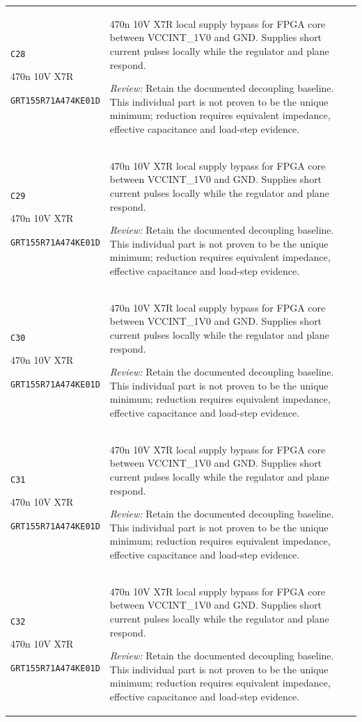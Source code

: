 \documentclass[10pt,a4paper]{article}
\begin{document}
\begin{longtable}{@{}P{46mm}P{117mm}@{}}
\nolinkurl{C28}\par 470n 10V X7R\par\scriptsize \nolinkurl{GRT155R71A474KE01D} & 470n 10V X7R local supply bypass for FPGA core between VCCINT\_1V0 and GND. Supplies short current pulses locally while the regulator and plane respond.\par\smallskip\textit{Review:} Retain the documented decoupling baseline. This individual part is not proven to be the unique minimum; reduction requires equivalent impedance, effective capacitance and load-step evidence. \\
\nolinkurl{C29}\par 470n 10V X7R\par\scriptsize \nolinkurl{GRT155R71A474KE01D} & 470n 10V X7R local supply bypass for FPGA core between VCCINT\_1V0 and GND. Supplies short current pulses locally while the regulator and plane respond.\par\smallskip\textit{Review:} Retain the documented decoupling baseline. This individual part is not proven to be the unique minimum; reduction requires equivalent impedance, effective capacitance and load-step evidence. \\
\nolinkurl{C30}\par 470n 10V X7R\par\scriptsize \nolinkurl{GRT155R71A474KE01D} & 470n 10V X7R local supply bypass for FPGA core between VCCINT\_1V0 and GND. Supplies short current pulses locally while the regulator and plane respond.\par\smallskip\textit{Review:} Retain the documented decoupling baseline. This individual part is not proven to be the unique minimum; reduction requires equivalent impedance, effective capacitance and load-step evidence. \\
\nolinkurl{C31}\par 470n 10V X7R\par\scriptsize \nolinkurl{GRT155R71A474KE01D} & 470n 10V X7R local supply bypass for FPGA core between VCCINT\_1V0 and GND. Supplies short current pulses locally while the regulator and plane respond.\par\smallskip\textit{Review:} Retain the documented decoupling baseline. This individual part is not proven to be the unique minimum; reduction requires equivalent impedance, effective capacitance and load-step evidence. \\
\nolinkurl{C32}\par 470n 10V X7R\par\scriptsize \nolinkurl{GRT155R71A474KE01D} & 470n 10V X7R local supply bypass for FPGA core between VCCINT\_1V0 and GND. Supplies short current pulses locally while the regulator and plane respond.\par\smallskip\textit{Review:} Retain the documented decoupling baseline. This individual part is not proven to be the unique minimum; reduction requires equivalent impedance, effective capacitance and load-step evidence. \\

\end{longtable}
\end{document}
